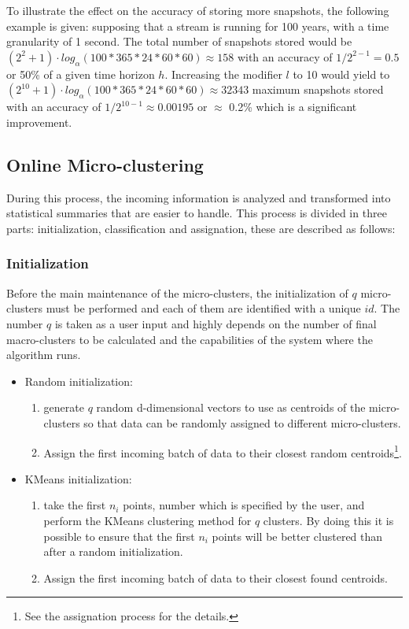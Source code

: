 \documentclass{llncs}
\begin{document}
To illustrate the effect on the accuracy of storing more snapshots, the following example is given: supposing that a stream is running for 100 years, with a time granularity of 1 second. The total number of snapshots stored would be $(2^2 + 1)\cdot log_{\alpha}(100*365*24*60*60) \approx 158$ with an accuracy of $1/ 2^{2-1} = 0.5$ or 50\% of a given time horizon $h$. Increasing the modifier $l$ to 10 would yield to $(2^{10} + 1)\cdot log_{\alpha}(100*365*24*60*60) \approx 32343$ maximum snapshots stored with an accuracy of $1/ 2^{10-1} \approx 0.00195$ or $\approx$ 0.2\% which is a significant improvement.


\subsection{Online Micro-clustering}

During this process, the incoming information is analyzed and transformed into statistical summaries that are easier to handle. This process is divided in three parts: initialization, classification and assignation, these are described as follows:

\subsubsection{Initialization}

Before the main maintenance of the micro-clusters, the initialization of $q$ micro-clusters must be performed and each of them are identified with a unique $id$. The number $q$ is taken as a user input and highly depends on the number of final macro-clusters to be calculated and the capabilities of the system where the algorithm runs. 

\begin{itemize}
 \item Random initialization:
 \begin{enumerate}
  \item generate $q$ random d-dimensional vectors to use as centroids of the micro-clusters so that data can be randomly assigned to different micro-clusters. 
  \item Assign the first incoming batch of data to their closest random centroids\footnote{See the assignation process for the details.}.
 \end{enumerate}

 \item KMeans initialization:
 \begin{enumerate}
  \item take the first $n_i$ points, number which is specified by the user, and perform the KMeans clustering method  for $q$ clusters. By doing this it is possible to ensure that the first $n_i$ points will be better clustered than after a random initialization. 
  \item Assign the first incoming batch of data to their closest found centroids.
 \end{enumerate}

\end{itemize}
\end{document}
